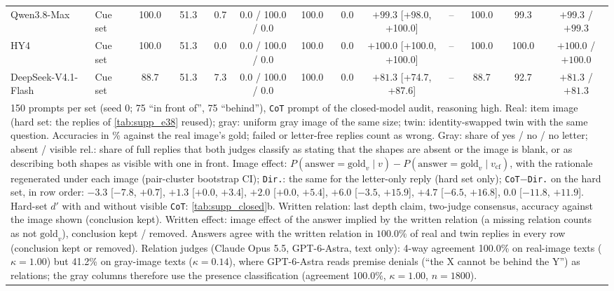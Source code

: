 \begin{tabular}{llccccccccccc}
Qwen3.8-Max & Cue set & 100.0 & 51.3 & 0.7 & 0.0 / 100.0 / 0.0 & 100.0 & 0.0 & $+99.3$ {\scriptsize[+98.0, +100.0]} & -- & 100.0 & 99.3 & $+99.3$ / $+99.3$ \\
HY4 & Cue set & 100.0 & 51.3 & 0.0 & 0.0 / 100.0 / 0.0 & 100.0 & 0.0 & $+100.0$ {\scriptsize[+100.0, +100.0]} & -- & 100.0 & 100.0 & $+100.0$ / $+100.0$ \\
DeepSeek-V4.1-Flash & Cue set & 88.7 & 51.3 & 7.3 & 0.0 / 100.0 / 0.0 & 100.0 & 0.0 & $+81.3$ {\scriptsize[+74.7, +87.6]} & -- & 88.7 & 92.7 & $+81.3$ / $+81.3$ \\
\bottomrule
\multicolumn{13}{p{0.98\linewidth}}{\scriptsize 150 prompts per set (seed 0; 75 ``in front of'', 75 ``behind''), \texttt{CoT} prompt of the closed-model audit, reasoning high. Real: item image (hard set: the replies of \cref{tab:supp_e38} reused); gray: uniform gray image of the same size; twin: identity-swapped twin with the same question. Accuracies in \% against the real image's gold; failed or letter-free replies count as wrong. Gray: share of yes / no / no letter; absent / visible rel.: share of full replies that both judges classify as stating that the shapes are absent or the image is blank, or as describing both shapes as visible with one in front. Image effect: $P(\text{answer}=\text{gold}_v\mid v)-P(\text{answer}=\text{gold}_v\mid v_\mathrm{cf})$, with the rationale regenerated under each image (pair-cluster bootstrap CI); \texttt{Dir.}: the same for the letter-only reply (hard set only); \texttt{CoT}$-$\texttt{Dir.} on the hard set, in row order: $-3.3$ [$-7.8$, $+0.7$], $+1.3$ [$+0.0$, $+3.4$], $+2.0$ [$+0.0$, $+5.4$], $+6.0$ [$-3.5$, $+15.9$], $+4.7$ [$-6.5$, $+16.8$], $0.0$ [$-11.8$, $+11.9$]. Hard-set $d'$ with and without visible \texttt{CoT}: \cref{tab:supp_closed}b. Written relation: last depth claim, two-judge consensus, accuracy against the image shown (conclusion kept). Written effect: image effect of the answer implied by the written relation (a missing relation counts as not $\text{gold}_v$), conclusion kept / removed. Answers agree with the written relation in $100.0\%$ of real and twin replies in every row (conclusion kept or removed). Relation judges (Claude Opus 5.5, GPT-6-Astra, text only): 4-way agreement 100.0\% on real-image texts ($\kappa=1.00$) but 41.2\% on gray-image texts ($\kappa=0.14$), where GPT-6-Astra reads premise denials (``the X cannot be behind the Y'') as relations; the gray columns therefore use the presence classification (agreement 100.0\%, $\kappa=1.00$, $n=1800$).} \\
\end{tabular}
